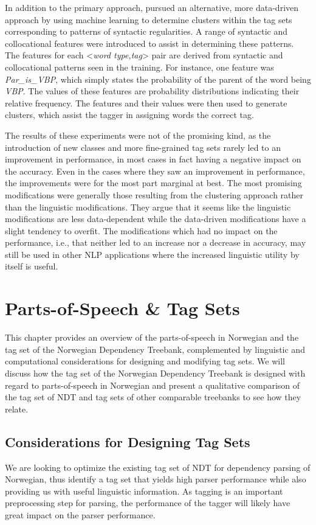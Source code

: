 \documentclass[a4paper,12pt,english]{book}
\begin{document}
In addition to the primary approach,  pursued an alternative,
more data-driven approach by using machine learning to determine clusters
within the tag sets corresponding to patterns of syntactic regularities. A
range of syntactic and collocational features were introduced to assist in
determining these patterns. The features for each <\emph{word type,tag}> pair are
derived from syntactic and collocational patterns seen in the training. For
instance, one feature was \emph{Par\_is\_VBP}, which simply states the
probability of the parent of the word being \emph{VBP}. The values of these
features are probability distributions indicating their relative frequency. The
features and their values were then used to generate clusters, which assist the
tagger in assigning words the correct tag.

The results of these experiments were not of the promising kind, as the
introduction of new classes and more fine-grained tag sets rarely led to an
improvement in performance, in most cases in fact having a negative impact on
the accuracy. Even in the cases where they saw an improvement in performance,
the improvements were for the most part marginal at best. The most promising
modifications were generally those resulting from the clustering approach
rather than the linguistic modifications. They argue that it seems like the
linguistic modifications are less data-dependent while the data-driven
modifications have a slight tendency to overfit. The modifications which had no
impact on the performance, i.e., that neither led to an increase nor a decrease
in accuracy, may still be used in other NLP applications where the increased
linguistic utility by itself is useful.

\chapter{Parts-of-Speech \& Tag Sets}
\label{chap:posandtagsets}
 This chapter provides an overview of the parts-of-speech in Norwegian and the
tag set of the Norwegian Dependency Treebank, complemented by linguistic and
computational considerations for designing and modifying tag sets.  We will
discuss how the tag set of the Norwegian Dependency Treebank is designed with
regard to parts-of-speech in Norwegian and present a qualitative comparison of
the tag set of NDT and tag sets of other comparable treebanks to see how they
relate.

\section{Considerations for Designing Tag Sets}
We are looking to optimize the existing tag set of NDT for dependency parsing
of Norwegian, thus identify a tag set that yields high parser performance while
also providing us with useful linguistic information. As tagging is an
important preprocessing step for parsing, the performance of the tagger will
likely have great impact on the parser performance.
\end{document}
